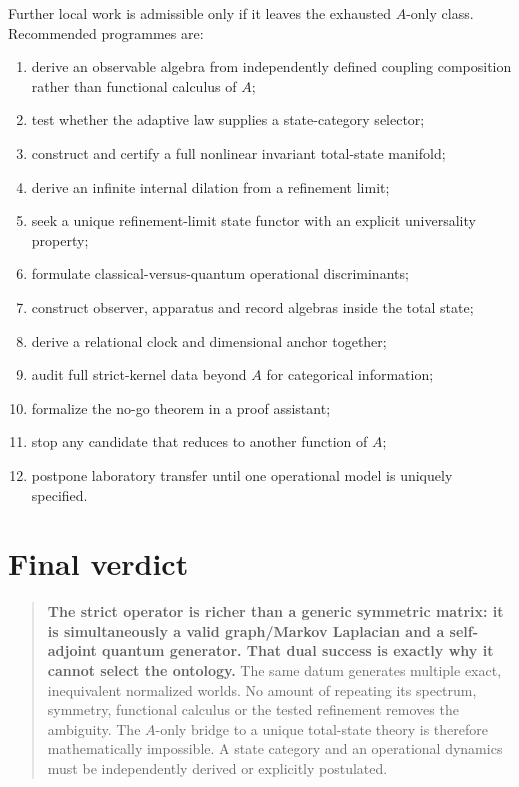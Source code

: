 \documentclass[11pt,a4paper]{article}
\begin{document}
Further local work is admissible only if it leaves the exhausted $A$-only
class.  Recommended programmes are:
\begin{enumerate}
\item derive an observable algebra from independently defined coupling
      composition rather than functional calculus of $A$;
\item test whether the adaptive law supplies a state-category selector;
\item construct and certify a full nonlinear invariant total-state manifold;
\item derive an infinite internal dilation from a refinement limit;
\item seek a unique refinement-limit state functor with an explicit
      universality property;
\item formulate classical-versus-quantum operational discriminants;
\item construct observer, apparatus and record algebras inside the total state;
\item derive a relational clock and dimensional anchor together;
\item audit full strict-kernel data beyond $A$ for categorical information;
\item formalize the no-go theorem in a proof assistant;
\item stop any candidate that reduces to another function of $A$;
\item postpone laboratory transfer until one operational model is uniquely
      specified.
\end{enumerate}

\section{Final verdict}

\begin{quote}
\textbf{The strict operator is richer than a generic symmetric matrix: it is
simultaneously a valid graph/Markov Laplacian and a self-adjoint quantum
generator.  That dual success is exactly why it cannot select the ontology.}
The same datum generates multiple exact, inequivalent normalized worlds.  No
amount of repeating its spectrum, symmetry, functional calculus or the tested
refinement removes the ambiguity.  The $A$-only bridge to a unique total-state
theory is therefore mathematically impossible.  A state category and an
operational dynamics must be independently derived or explicitly postulated.
\end{quote}
\end{document}
